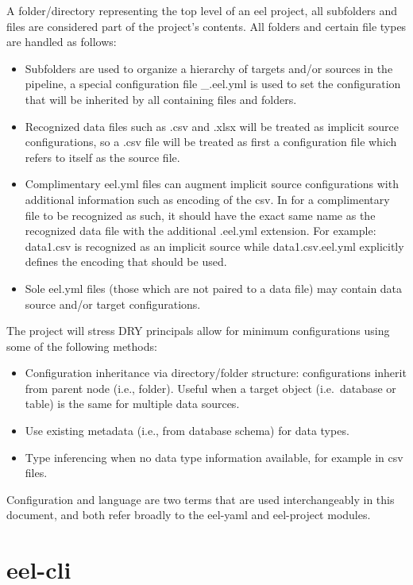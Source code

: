 A folder/directory representing the top level of an eel project, all
subfolders and files are considered part of the project's contents. All
folders and certain file types are handled as follows:

\begin{itemize}
\item
  Subfolders are used to organize a hierarchy of targets and/or sources
  in the pipeline, a special configuration file \_.eel.yml is used to
  set the configuration that will be inherited by all containing files
  and folders.
\item
  Recognized data files such as .csv and .xlsx will be treated as
  implicit source configurations, so a .csv file will be treated as
  first a configuration file which refers to itself as the source file.
\item
  Complimentary eel.yml files can augment implicit source configurations
  with additional information such as encoding of the csv. In for a
  complimentary file to be recognized as such, it should have the exact
  same name as the recognized data file with the additional .eel.yml
  extension. For example: data1.csv is recognized as an implicit source
  while data1.csv.eel.yml explicitly defines the encoding that should be
  used.
\item
  Sole eel.yml files (those which are not paired to a data file) may
  contain data source and/or target configurations.
\end{itemize}

The project will stress DRY principals allow for minimum configurations
using some of the following methods:

\begin{itemize}
\item
  Configuration inheritance via directory/folder structure:
  configurations inherit from parent node (i.e., folder). Useful when a
  target object (i.e.~database or table) is the same for multiple data
  sources.
\item
  Use existing metadata (i.e., from database schema) for data types.
\item
  Type inferencing when no data type information available, for example
  in csv files.
\end{itemize}

Configuration and language are two terms that are used interchangeably
in this document, and both refer broadly to the eel-yaml and eel-project
modules.

\section{eel-cli}\label{eel-cli}

